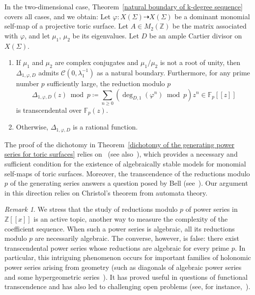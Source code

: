 \documentclass[11pt,a4paper]{article}
\theoremstyle{plain}
\theoremstyle{remark}
\newtheorem{remark}[theorem]{Remark}
\theoremstyle{custombold}
\newenvironment{customtheorem}[1]
  {\renewcommand\theinnercustomtheorem{#1}\innercustomtheorem}
  {\endinnercustomtheorem}
\begin{document}
In the two-dimensional case, Theorem~\ref{natural boundary of k-degree sequence} covers all cases, and we obtain:
\begin{customtheorem}{D}\label{dichotomy of the generating power series for toric surfaces}    Let $\varphi\colon X(\Sigma)\dashrightarrow X(\Sigma)$ be a dominant monomial self-map of a projective toric surface. Let $A\in M_2(\mathbb Z)$ be the matrix associated with $\varphi$, and let $\mu_1$, $\mu_2$ be its eigenvalues. Let $D$ be an ample Cartier divisor on $X(\Sigma)$.
\begin{enumerate}
    \item If $\mu_1$ and $\mu_2$ are complex conjugates and $\mu_1/\mu_2$ is not a root of unity, then  $\Delta_{1,\varphi,D}$ admits $\mathcal{C}(0,\lambda_1^{-1})$ as a natural boundary. Furthermore, for any prime number $p$ sufficiently large, the reduction modulo $p$  
    $$\Delta_{1,\varphi,D}(z)\bmod p\coloneqq \sum_{n\geq0}(\deg_{D,1}(\varphi^n)\bmod p)z^n\in\mathbb F_p[[z]]$$
    is transcendental over $\mathbb F_p(z)$.

    \item Otherwise, $\Delta_{1,\varphi,D}$ is a rational function.
\end{enumerate}
\end{customtheorem}



The proof of the dichotomy in Theorem~\ref{dichotomy of the generating power series for toric surfaces} relies on~\cite[Th\'eor\`eme~principal]{Favre-2003} 
(see also~\cite[Theorem~C']{Jonsson-Wulcan-2011}), which provides a necessary and sufficient condition for the existence of algebraically stable models for monomial self-maps of toric surfaces.
Moreover, the transcendence of the reductions modulo 
$p$ of the generating series answers a question posed by Bell (see~\cite{Bell-talk-NTWS}). Our argument in this direction relies on Christol's theorem from automata theory.

\begin{remark}
We stress that the study of reductions modulo $p$ of power series in $\mathbb Z[[x]]$ is an active topic, another way to measure the complexity of the coefficient sequence. When such a power series is algebraic, all its reductions modulo $p$ are necessarily algebraic. The converse, however, is false: there exist transcendental power series whose reductions are algebraic for every prime $p$. In particular, this intriguing phenomenon occurs for important families of holonomic power series arising from geometry (such as diagonals of algebraic power series~\cite{Deligne-1984} and some hypergeometric series~\cite{Vargas-Montoya-2021}).  It has proved useful in questions of functional transcendence and has also led to challenging open problems (see, for instance,~\cite{Adamczewski-Bell-2013,Adamczewski-Bell-Delaygue-2019,Adamczewski-Bostan-Caruso-2023,Caruso-Furnsinn-Vargas-Montoya-2025}).
\end{remark}
\end{document}
